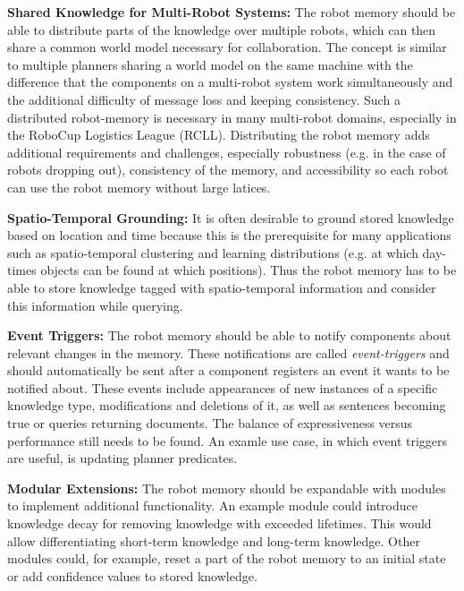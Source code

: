 \documentclass[a4paper,11pt]{article}
\begin{document}
\smallskip
\textbf{Shared Knowledge for Multi-Robot Systems:} The robot memory
should be able to distribute parts of the knowledge over multiple
robots, which can then share a common world model necessary for
collaboration. The concept is similar to multiple planners sharing a
world model on the same machine with the difference that the
components on a multi-robot system work simultaneously and the
additional difficulty of message loss and keeping consistency. Such a
distributed robot-memory is necessary in many multi-robot domains,
especially in the RoboCup Logistics League (RCLL).
Distributing the robot memory adds
additional requirements and challenges, especially robustness (e.g. in
the case of robots dropping out), consistency of the memory, and
accessibility so each robot can use the robot memory without large
latices.

\smallskip
\textbf{Spatio-Temporal Grounding:} It is often desirable to ground
stored knowledge based on location and time because this is the
prerequisite for many applications such as spatio-temporal clustering
and learning distributions (e.g. at which day-times objects can be
found at which positions). Thus the robot
memory has to be able to store knowledge tagged with spatio-temporal
information and consider this information while querying.

\smallskip
\textbf{Event Triggers:} The robot memory should be able to notify
components about relevant changes in the memory.  These notifications
are called \emph{event-triggers} and should automatically be sent
after a component registers an event it wants to be notified
about. These events include appearances of new instances of a specific
knowledge type, modifications and deletions of it, as well as
sentences becoming true or queries returning documents. The balance of
expressiveness versus performance still needs to be found. An examle
use case, in which event triggers are useful, is updating planner
predicates.

\smallskip
\textbf{Modular Extensions:} The robot memory should be expandable
with modules to implement additional functionality. An example module
could introduce knowledge decay for removing knowledge with exceeded
lifetimes. This would allow differentiating short-term knowledge and
long-term knowledge. Other modules could, for example, reset a part of
the robot memory to an initial state or add confidence values to
stored knowledge.
\end{document}

